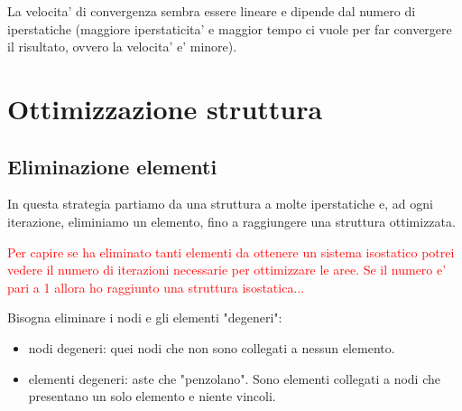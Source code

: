 \documentclass[]{article}
\begin{document}
La velocita' di convergenza sembra essere lineare e dipende dal numero di iperstatiche (maggiore iperstaticita' e maggior tempo ci vuole per far convergere il risultato, ovvero la velocita' e' minore).


\section{Ottimizzazione struttura}
\subsection{Eliminazione elementi}

In questa strategia partiamo da una struttura a molte iperstatiche e, ad ogni iterazione, eliminiamo un elemento, fino a raggiungere una struttura ottimizzata.

\textcolor{red}{Per capire se ha eliminato tanti elementi da ottenere un sistema isostatico potrei vedere il numero di iterazioni necessarie per ottimizzare le aree. Se il numero e' pari a 1 allora ho raggiunto una struttura isostatica...}

Bisogna eliminare i nodi e gli elementi "degeneri":
\begin{itemize}
\item nodi degeneri: quei nodi che non sono collegati a nessun elemento.
\item elementi degeneri: aste che "penzolano". Sono elementi collegati a nodi che presentano un solo elemento e niente vincoli.
\end{itemize}
\end{document}
